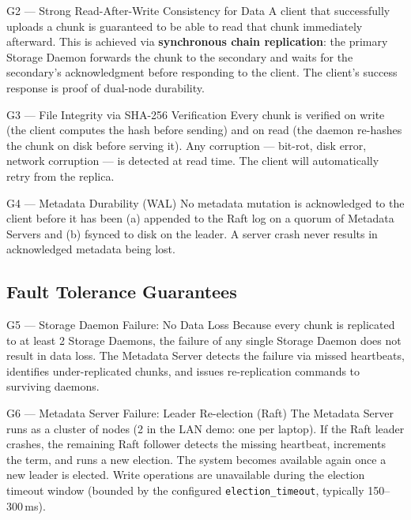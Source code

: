 \documentclass[12pt,a4paper]{article}
\begin{document}
\begin{guaranteebox}{G2 — Strong Read-After-Write Consistency for Data}
A client that successfully uploads a chunk is guaranteed to be able to read that chunk immediately afterward. This is achieved via \textbf{synchronous chain replication}: the primary Storage Daemon forwards the chunk to the secondary and waits for the secondary's acknowledgment before responding to the client. The client's success response is proof of dual-node durability.
\end{guaranteebox}

\begin{guaranteebox}{G3 — File Integrity via SHA-256 Verification}
Every chunk is verified on write (the client computes the hash before sending) and on read (the daemon re-hashes the chunk on disk before serving it). Any corruption — bit-rot, disk error, network corruption — is detected at read time. The client will automatically retry from the replica.
\end{guaranteebox}

\begin{guaranteebox}{G4 — Metadata Durability (WAL)}
No metadata mutation is acknowledged to the client before it has been (a) appended to the Raft log on a quorum of Metadata Servers and (b) fsynced to disk on the leader. A server crash never results in acknowledged metadata being lost.
\end{guaranteebox}

\subsection{Fault Tolerance Guarantees}

\begin{guaranteebox}{G5 — Storage Daemon Failure: No Data Loss}
Because every chunk is replicated to at least 2 Storage Daemons, the failure of any single Storage Daemon does not result in data loss. The Metadata Server detects the failure via missed heartbeats, identifies under-replicated chunks, and issues re-replication commands to surviving daemons.
\end{guaranteebox}

\begin{guaranteebox}{G6 — Metadata Server Failure: Leader Re-election (Raft)}
The Metadata Server runs as a cluster of nodes (2 in the LAN demo: one per laptop). If the Raft leader crashes, the remaining Raft follower detects the missing heartbeat, increments the term, and runs a new election. The system becomes available again once a new leader is elected. Write operations are unavailable during the election timeout window (bounded by the configured \texttt{election\_timeout}, typically 150--300\,ms).
\end{guaranteebox}
\end{document}
